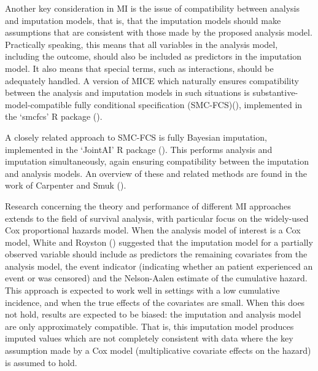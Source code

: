 \documentclass[
  letterpaper,
  DIV=11,
  numbers=noendperiod]{scrreprt}
\begin{document}
Another key consideration in MI is the issue of compatibility between
analysis and imputation models, that is, that the imputation models
should make assumptions that are consistent with those made by the
proposed analysis model. Practically speaking, this means that all
variables in the analysis model, including the outcome, should also be
included as predictors in the imputation model. It also means that
special terms, such as interactions, should be adequately handled. A
version of MICE which naturally ensures compatibility between the
analysis and imputation models in such situations is
substantive-model-compatible fully conditional specification
(SMC-FCS)(), implemented in the `smcfcs' R package
().

A closely related approach to SMC-FCS is fully Bayesian imputation,
implemented in the `JointAI' R package
(). This performs analysis and imputation simultaneously, again
ensuring compatibility between the imputation and analysis models. An
overview of these and related methods are found in the work of Carpenter
and Smuk ().

Research concerning the theory and performance of different MI
approaches extends to the field of survival analysis, with particular
focus on the widely-used Cox proportional hazards model. When the
analysis model of interest is a Cox model, White and Royston
() suggested that the imputation model for a partially observed
variable should include as predictors the remaining covariates from the
analysis model, the event indicator (indicating whether an patient
experienced an event or was censored) and the Nelson-Aalen estimate of
the cumulative hazard. This approach is expected to work well in
settings with a low cumulative incidence, and when the true effects of
the covariates are small. When this does not hold, results are expected
to be biased: the imputation and analysis model are only approximately
compatible. That is, this imputation model produces imputed values which
are not completely consistent with data where the key assumption made by
a Cox model (multiplicative covariate effects on the hazard) is assumed
to hold.
\end{document}
